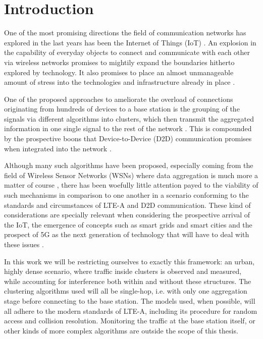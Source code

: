 \chapter{Introduction}

One of the most promising directions the field of communication networks has explored in the last years has been the Internet of Things (IoT) \cite{Shariatmadari2015a}. An explosion in the capability of everyday objects to connect and communicate with each other via wireless networks promises to mightily expand the boundaries hitherto explored by technology. It also promises to place an almost unmanageable amount of stress into the technologies and infrastructure already in place \cite{Polese2016}. 

One of the proposed approaches to ameliorate the overload of connections originating from hundreds of devices to a base station is the grouping of the signals via different algorithms into clusters, which then transmit the aggregated information in one single signal to the rest of the network \cite{Laya2014a}. This is compounded by the prospective boons that Device-to-Device (D2D) communication promises when integrated into the network \cite{6163598}. 

Although many such algorithms have been proposed, especially coming from the field of Wireless Sensor Networks (WSNs) where data aggregation is much more a matter of course \cite{Afsar2014}, there has been woefully little attention payed to the viability of such mechanisms in comparison to one another in a scenario conforming to the standards and circumstances of LTE-A and D2D communication. These kind of considerations are specially relevant when considering the prospective arrival of the IoT, the emergence of concepts such as smart grids and smart cities and the prospect of 5G as the next generation of technology that will have to deal with these issues \cite{6568922}. 

In this work we will be restricting ourselves to exactly this framework: an urban, highly dense scenario, where traffic inside clusters is observed and measured, while accounting for interference both within and without these structures. The clustering algorithms used will all be single-hop, i.e. with only one aggregation stage before connecting to the base station. The models used, when possible, will all adhere to the modern standards of LTE-A, including its procedure for random access and collision resolution. Monitoring the traffic at the base station itself, or other kinds of more complex algorithms are outside the scope of this thesis.

